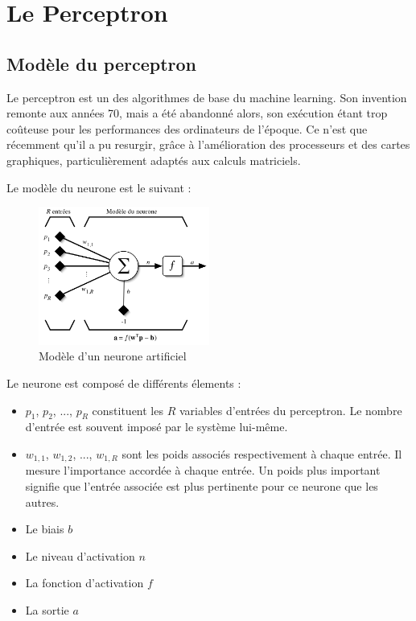 \section{Le Perceptron}
\fancyhead[R]{\textit{\nouppercase{\leftmark}}}

\subsection{Modèle du perceptron}

Le perceptron est un des algorithmes de base du machine learning. Son invention remonte aux années 70, mais a été abandonné alors, 
son exécution étant trop coûteuse pour les performances des ordinateurs de l’époque. Ce n’est que récemment qu’il a pu resurgir, grâce 
à l’amélioration des processeurs et des cartes graphiques, particulièrement adaptés aux calculs matriciels.

Le modèle du neurone est le suivant : 

\begin{figure}[h]
 \centering
 \includegraphics[width=0.5\textwidth]{img/neurone.png}
 \caption{Modèle d'un neurone artificiel}
\end{figure}

Le neurone est composé de différents élements : 
\begin{itemize}
 \item $p_1$, $p_2$, ..., $p_R$ constituent les $R$ variables d'entrées du perceptron. Le nombre d'entrée est souvent imposé par le système lui-même.
 \item $w_{1,1}$, $w_{1,2}$, ..., $w_{1,R}$ sont les poids associés respectivement à chaque entrée. Il mesure l'importance accordée à chaque entrée. Un poids
 plus important signifie que l'entrée associée est plus pertinente pour ce neurone que les autres.
 \item Le biais $b$
 \item Le niveau d'activation $n$
 \item La fonction d'activation $f$
 \item La sortie $a$
\end{itemize}

